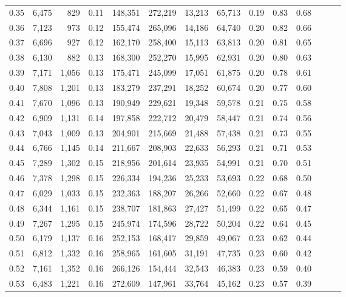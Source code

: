 \begin{tabular}{rrrrrrrrrrrrrr}
0.35 &  6,475 &    829 &  0.11 &  148,351 &  272,219 &  13,213 &  65,713 &  0.19 &  0.83 &      0.68 \\
0.36 &  7,123 &    973 &  0.12 &  155,474 &  265,096 &  14,186 &  64,740 &  0.20 &  0.82 &      0.66 \\
0.37 &  6,696 &    927 &  0.12 &  162,170 &  258,400 &  15,113 &  63,813 &  0.20 &  0.81 &      0.65 \\
0.38 &  6,130 &    882 &  0.13 &  168,300 &  252,270 &  15,995 &  62,931 &  0.20 &  0.80 &      0.63 \\
0.39 &  7,171 &  1,056 &  0.13 &  175,471 &  245,099 &  17,051 &  61,875 &  0.20 &  0.78 &      0.61 \\
0.40 &  7,808 &  1,201 &  0.13 &  183,279 &  237,291 &  18,252 &  60,674 &  0.20 &  0.77 &      0.60 \\
0.41 &  7,670 &  1,096 &  0.13 &  190,949 &  229,621 &  19,348 &  59,578 &  0.21 &  0.75 &      0.58 \\
0.42 &  6,909 &  1,131 &  0.14 &  197,858 &  222,712 &  20,479 &  58,447 &  0.21 &  0.74 &      0.56 \\
0.43 &  7,043 &  1,009 &  0.13 &  204,901 &  215,669 &  21,488 &  57,438 &  0.21 &  0.73 &      0.55 \\
0.44 &  6,766 &  1,145 &  0.14 &  211,667 &  208,903 &  22,633 &  56,293 &  0.21 &  0.71 &      0.53 \\
0.45 &  7,289 &  1,302 &  0.15 &  218,956 &  201,614 &  23,935 &  54,991 &  0.21 &  0.70 &      0.51 \\
0.46 &  7,378 &  1,298 &  0.15 &  226,334 &  194,236 &  25,233 &  53,693 &  0.22 &  0.68 &      0.50 \\
0.47 &  6,029 &  1,033 &  0.15 &  232,363 &  188,207 &  26,266 &  52,660 &  0.22 &  0.67 &      0.48 \\
0.48 &  6,344 &  1,161 &  0.15 &  238,707 &  181,863 &  27,427 &  51,499 &  0.22 &  0.65 &      0.47 \\
0.49 &  7,267 &  1,295 &  0.15 &  245,974 &  174,596 &  28,722 &  50,204 &  0.22 &  0.64 &      0.45 \\
0.50 &  6,179 &  1,137 &  0.16 &  252,153 &  168,417 &  29,859 &  49,067 &  0.23 &  0.62 &      0.44 \\
0.51 &  6,812 &  1,332 &  0.16 &  258,965 &  161,605 &  31,191 &  47,735 &  0.23 &  0.60 &      0.42 \\
0.52 &  7,161 &  1,352 &  0.16 &  266,126 &  154,444 &  32,543 &  46,383 &  0.23 &  0.59 &      0.40 \\
0.53 &  6,483 &  1,221 &  0.16 &  272,609 &  147,961 &  33,764 &  45,162 &  0.23 &  0.57 &      0.39 \\

\end{tabular}
